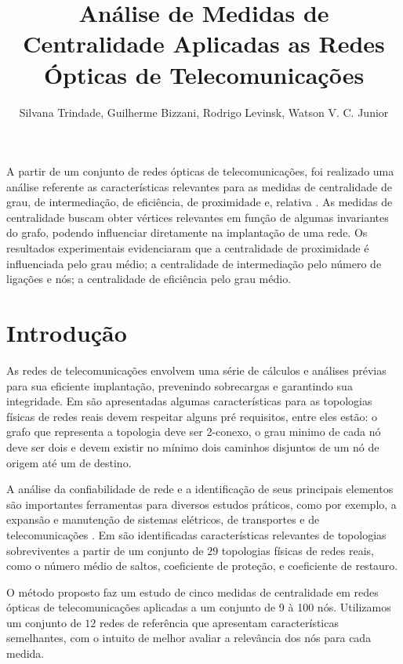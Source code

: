 \documentclass[12pt]{article}
\title{Análise de Medidas de Centralidade Aplicadas as Redes Ópticas de Telecomunicações}
\author{Silvana Trindade\inst{1}, Guilherme Bizzani\inst{1}, Rodrigo Levinsk\inst{1}, Watson V. C. Junior\inst{1}}
\begin{document}
 

\maketitle

\begin{abstract}
 
\end{abstract}
\begin{resumo} 

A partir de um conjunto de redes ópticas de telecomunicações, foi realizado uma análise referente as características relevantes para as  medidas de centralidade de grau, de intermediação, de eficiência, de proximidade e, relativa .
As medidas de centralidade buscam obter vértices relevantes em função de algumas invariantes do grafo, podendo  influenciar diretamente na implantação de uma rede.
Os resultados experimentais evidenciaram que a centralidade de proximidade é influenciada pelo grau médio; a centralidade de intermediação pelo número de ligações e nós; a centralidade de eficiência pelo grau médio.
\end{resumo}


\section{Introdução}
As redes de telecomunicações envolvem uma série de cálculos e análises prévias para sua eficiente implantação, prevenindo sobrecargas e garantindo sua integridade.
Em \cite{pavan} são apresentadas algumas características para as topologias físicas de redes reais devem respeitar alguns pré requisitos, entre eles estão: o grafo que representa a topologia deve ser  2-conexo, o grau minimo de cada nó deve ser dois e devem existir no mínimo dois caminhos disjuntos de um nó de origem até um de destino.

A análise da confiabilidade de rede e a identificação de seus principais elementos são importantes ferramentas para diversos estudos práticos, como por exemplo, a expansão e manutenção de sistemas elétricos, de transportes e de telecomunicações \cite{silva}.
Em \cite{pavan} são identificadas características relevantes de topologias sobreviventes a partir de um conjunto de $29$ topologias físicas de redes reais, como o número médio de saltos, coeficiente de proteção, e coeficiente de restauro.

O método proposto faz um estudo de cinco medidas de centralidade em redes ópticas de telecomunicações aplicadas a um conjunto de 9 à 100 nós.
Utilizamos um conjunto de $12$ redes de referência que apresentam características semelhantes, com o intuito de melhor avaliar a relevância dos nós para cada medida.
\end{document}
